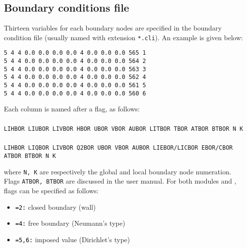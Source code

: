 {\subsection{Boundary conditions file}\label{sec:flags}
Thirteen variables for each boundary nodes are specified in the boundary condition file (usually named with extension \texttt{*.cli}). An example is given below: 

\begin{lstlisting}[frame=trBL]
5 4 4 0.0 0.0 0.0 0.0 4 0.0 0.0 0.0 565 1
5 4 4 0.0 0.0 0.0 0.0 4 0.0 0.0 0.0 564 2
5 4 4 0.0 0.0 0.0 0.0 4 0.0 0.0 0.0 563 3
5 4 4 0.0 0.0 0.0 0.0 4 0.0 0.0 0.0 562 4
5 4 4 0.0 0.0 0.0 0.0 4 0.0 0.0 0.0 561 5
5 4 4 0.0 0.0 0.0 0.0 4 0.0 0.0 0.0 560 6
\end{lstlisting}

Each column is named after a flag, as follows:
\subsubsection{}
\begin{lstlisting}[frame=trBL]
LIHBOR LIUBOR LIVBOR HBOR UBOR VBOR AUBOR LITBOR TBOR ATBOR BTBOR N K
\end{lstlisting}
\subsubsection{\sisyphe{}}
\begin{lstlisting}[frame=trBL]
LIHBOR LIQBOR LIVBOR Q2BOR UBOR VBOR AUBOR LIEBOR/LICBOR EBOR/CBOR ATBOR BTBOR N K
\end{lstlisting}
where \texttt{N, K} are respectively the global and local boundary node numeration. Flags \texttt{ATBOR, BTBOR} are discussed in the  user manual. For both modules  and \sisyphe{}, flags can be specified as follows: 
\begin{itemize}
\item \texttt{\textcolor{black}{=2:}} closed boundary (wall)
\item \texttt{\textcolor{black}{=4:}} free boundary (Neumann's type)
\item \texttt{\textcolor{black}{=5,6:}} imposed value (Dirichlet's type)
\end{itemize}

}
